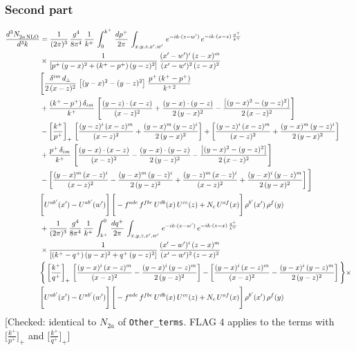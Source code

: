 \documentclass[9pt]{article}
\numberwithin{equation}{section}
\begin{document}
\subsubsection*{Second part}
\begin{align}
    \frac{d^{3}N_{2a\,\rm NLO}^{\rm}}{d^{3}k}  & =  \frac{1}{(2\pi)^{3}}\, \frac{g^{4}}{8\pi^{4}}\,\frac{1}{k^{+}}\,\int_{0}^{k^{+}}\, \frac{dp^{+}}{2\pi}\,\int_{x,y,z,x',w'}\, e^{-ik\cdot(z-w')}\,e^{-ik\cdot (x-z)\,\frac{p^{+}}{k^{+}}}\notag \\ & \times\frac{1}{\left[p^{+}\,(y-x)^{2}+(k^{+}-p^{+})\,(y-z)^{2}\right]}\, \frac{(x'-w')^{i}\,(z-x)^{m}}{(x'-w')^{2}\,(z-x)^{2}} \notag \\ & \Bigg[\frac{\delta^{im}\,d_{\perp}}{2\,(x-z)^{2}}\,\left[(y-x)^{2}-(y-z)^{2}\right]\,\frac{p^{+}\,(k^{+}-p^{+})}{k^{+\,2}}\notag \\ & +\frac{(k^{+}-p^{+})\,\delta_{im}}{k^{+}}\,\left[\frac{(y-z)\cdot (x-z)}{(x-z)^{2}}+\frac{(y-x)\cdot (y-z)}{2\,(y-x)^{2}}-\frac{\left[(y-x)^{2}-(y-z)^{2}\right]}{2\,(x-z)^{2}}\right]\notag \\ & -\left[\frac{k^{+}}{p^{+}}\right]_{+}\,\left[\frac{(y-z)^{i}\,(x-z)^{m}}{(x-z)^{2}}+\frac{(y-x)^{m}\,(y-z)^{i}}{2\,(y-x)^{2}}\right]+ \left[\frac{(y-z)^{i}\,(x-z)^{m}}{(x-z)^{2}}+\frac{(y-x)^{m}\,(y-z)^{i}}{2\,(y-x)^{2}}\right]\notag \\ & +\frac{p^{+}\,\delta_{im}}{k^{+}}\,\left[\frac{(y-x)\cdot (x-z)}{(x-z)^{2}}-\frac{(y-x)\cdot (y-z)}{2\,(y-z)^{2}}-\frac{\left[(y-x)^{2}-(y-z)^{2}\right]}{2\,(x-z)^{2}}\right]\notag \\ &-\left[\frac{(y-x)^{m}\,(x-z)^{i}}{(x-z)^{2}}-\frac{(y-x)^{m}\,(y-z)^{i}}{2\,(y-z)^{2}}+\frac{(y-z)^{m}\,(x-z)^{i}}{(x-z)^{2}}+\frac{(y-x)^{i}\,(y-z)^{m}}{2\,(y-x)^{2}}\right]\Bigg] \notag \\ & \Bigg[U^{ab'}(x')-U^{ab'}(w')\Bigg]\,\Bigg[-f^{adc}\,f^{fbe}\,U^{db}(x)\,U^{ce}(z)+N_{c}\,U^{af}(x)\Bigg]\,\rho^{b'}(x')\,\rho^{f}(y)\notag \\ & + \frac{1}{(2\pi)^{3}}\,\frac{g^{4}}{8\pi^{4}}\,\frac{1}{k^{+}}\, \int^{0}_{k^{+}}\, \frac{dq^{+}}{2\pi} \,  \int_{x,y,z,x',w'}\,e^{-ik\cdot(x-w')}\,e^{-ik\cdot (z-x)\,\frac{q^{+}}{k^{+}}}\notag \\ & \times\frac{1}{\left[(k^{+}-q^{+})\,(y-x)^{2}+q^{+}\,(y-z)^{2}\right]}\, \frac{(x'-w')^{i}\,(z-x)^{m}}{(x'-w')^{2}\,(z-x)^{2}} \notag \\ &\Bigg\{\left[\frac{k^{+}}{q^{+}}\right]_{+}\,\left[\frac{(y-x)^{i}\,(x-z)^{m}}{(x-z)^{2}}-\frac{(y-x)^{i}\,(y-z)^{m}}{2\,(y-z)^{2}}\right] -\left[\frac{(y-x)^{i}\,(x-z)^{m}}{(x-z)^{2}}-\frac{(y-x)^{i}\,(y-z)^{m}}{2\,(y-z)^{2}}\right]\Bigg\}\times\,\notag \\ & \Bigg[U^{ab'}(x')-U^{ab'}(w')\Bigg]\,\Bigg[-f^{adc}\,f^{fbe}\,U^{db}(x)\,U^{ce}(z)+N_{c}\,U^{af}(x)\Bigg]\,\rho^{b'}(x')\,\rho^{f}(y)
\end{align} {\color{red}[Checked: identical to $N_{2a}$ of \texttt{Other\_terms}. FLAG 4 applies to the terms with $\big[\frac{k^{+}}{p^{+}}\big]_{+}$ and $\big[\frac{k^{+}}{q^{+}}\big]_{+}$]}\par\noindent 
\end{document}

